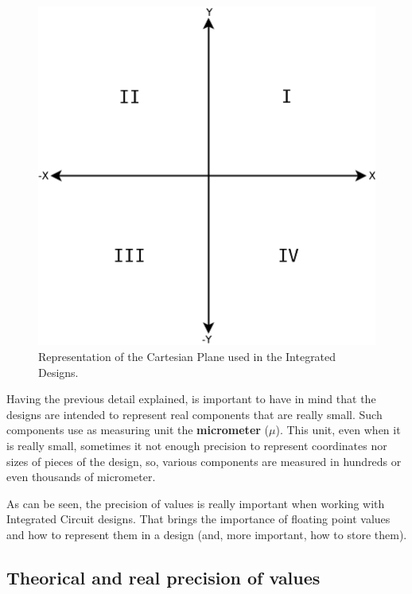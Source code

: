 \documentclass[11pt,twoside,openany,x11names,svgnames]{memoir}
\begin{document}
\begin{figure}
	\centering
	\label{fig:iccoordinates}
	\includegraphics[scale=0.2, clip=true, trim= 0pt 0pt 0pt 0pt]{images/chapter03-image02}
	\caption{Representation of the Cartesian Plane used in the Integrated Designs.}
\end{figure}

Having the previous detail explained, is important to have in mind that the designs are intended to represent real components that are really small. Such components use as measuring unit the \textbf{micrometer} (\textbf{$\mu$}). This unit, even when it is really small, sometimes it not enough precision to represent coordinates nor sizes of pieces of the design, so, various components are measured in hundreds or even thousands of micrometer.

As can be seen, the precision of values is really important when working with Integrated Circuit designs. That brings the importance of floating point values and how to represent them in a design (and, more important, how to store them).

\subsection{Theorical and real precision of values}\label{Theorical-and-real-precision-of-values}
\end{document}
